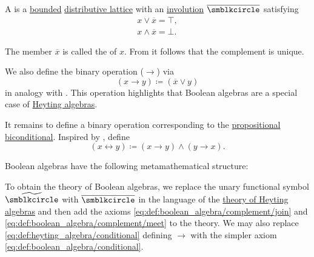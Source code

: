 \begin{definition}\label{def:boolean_algebra}
  A  is a \hyperref[def:semilattice/bounded]{bounded} \hyperref[def:semilattice/distributive_lattice]{distributive lattice} with an \hyperref[def:set_with_involution]{involution} \( \overline \placeholder \) satisfying
  \begin{align}
    x \vee \overline x = \top \label{eq:def:boolean_algebra/complement/join}, \\
    x \wedge \overline x = \bot \label{eq:def:boolean_algebra/complement/meet}.
  \end{align}

  The member \( \overline x \) is called the  of \( x \). From  it follows that the complement is unique.

  \begin{thmenum}[series=def:boolean_algebra]
     We also define the binary operation  (\( \rightarrow \)) via
    \begin{equation}\label{eq:def:boolean_algebra/conditional}
      (x \rightarrow y) \coloneqq (\overline x \vee y)
    \end{equation}
    in analogy with . This operation highlights that Boolean algebras are a special case of \hyperref[thm:boolean_algebra_properties/heyting_algebra]{Heyting algebras}.

     It remains to define a binary operation corresponding to the \hyperref[def:propositional_language/connectives/biconditional]{propositional biconditional}. Inspired by , define
    \begin{equation}\label{eq:def:boolean_algebra/biconditional}
      (x \leftrightarrow y) \coloneqq (x \rightarrow y) \wedge (y \rightarrow x).
    \end{equation}
  \end{thmenum}

  Boolean algebras have the following metamathematical structure:
  \begin{thmenum}[resume=def:boolean_algebra]
     To obtain the theory of Boolean algebras, we replace the unary functional symbol \( \widetilde{\placeholder} \) with \( \overline \placeholder \) in the language of the \hyperref[def:heyting_algebra/theory]{theory of Heyting algebras} and then add the axioms \eqref{eq:def:boolean_algebra/complement/join} and \eqref{eq:def:boolean_algebra/complement/meet} to the theory. We may also replace \eqref{eq:def:heyting_algebra/conditional} defining \( \rightarrow \) with the simpler axiom \eqref{eq:def:boolean_algebra/conditional}.


\end{thmenum}
\end{definition}

